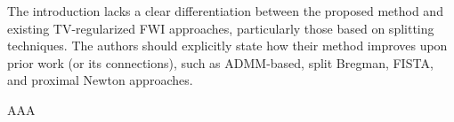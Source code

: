 \begin{point}
	The introduction lacks a clear differentiation between the proposed method and existing TV-regularized FWI approaches, particularly those based on splitting techniques. The authors should explicitly state how their method improves upon prior work (or its connections), such as ADMM-based, split Bregman, FISTA, and proximal Newton approaches.
\end{point}

\begin{reply}
AAA
\end{reply}

